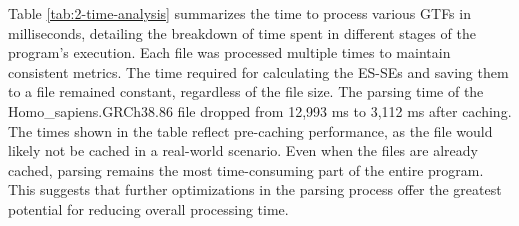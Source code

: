 \documentclass{article}
\begin{document}
    \begin{table}[H]
        \caption{Time Taken for each Dataset in ms}
        \label{tab:2-time-analysis}
        Table \ref{tab:2-time-analysis} summarizes the time to process various GTFs in milliseconds, detailing the breakdown of time spent in different stages of the program's execution. Each file was processed multiple times to maintain consistent metrics.
        The time required for calculating the ES-SEs and saving them to a file remained constant, regardless of the file size. The parsing time of the Homo\_sapiens.GRCh38.86 file dropped from 12,993 ms to 3,112 ms after caching. The times shown in the table reflect pre-caching performance, as the file would likely not be cached in a real-world scenario. Even when the files are already cached, parsing remains the most time-consuming part of the entire program. This suggests that further optimizations in the parsing process offer the greatest potential for reducing overall processing time.
    \end{table}
\end{document}
